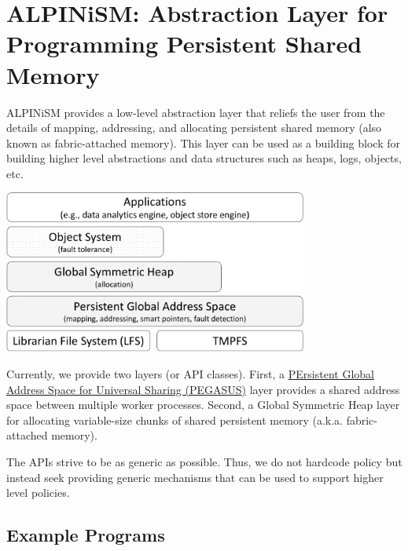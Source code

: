 \hypertarget{md__home_yuan_Benchmarks_whisper_mnemosyne-gcc_usermode_library_pmalloc_include_alps_src_mainpage_mainpage}{}\section{A\+L\+P\+I\+Ni\+S\+M\+: Abstraction Layer for Programming Persistent Shared Memory   }\label{md__home_yuan_Benchmarks_whisper_mnemosyne-gcc_usermode_library_pmalloc_include_alps_src_mainpage_mainpage}
A\+L\+P\+I\+Ni\+SM provides a low-\/level abstraction layer that reliefs the user from the details of mapping, addressing, and allocating persistent shared memory (also known as fabric-\/attached memory). This layer can be used as a building block for building higher level abstractions and data structures such as heaps, logs, objects, etc.

 
\begin{DoxyImage}
\includegraphics[width=10cm]{alps-layers}
\caption{A\+L\+P\+I\+Ni\+SM layers}
\end{DoxyImage}


Currently, we provide two layers (or A\+PI classes). First, a \hyperlink{md__home_yuan_Benchmarks_whisper_mnemosyne-gcc_usermode_library_pmalloc_include_alps_src_pegasus_pegasus_pegasuspage}{P\+Ersistent Global Address Space for Universal Sharing (P\+E\+G\+A\+S\+US)} layer provides a shared address space between multiple worker processes. Second, a Global Symmetric Heap layer for allocating variable-\/size chunks of shared persistent memory (a.\+k.\+a. fabric-\/attached memory).

The A\+P\+Is strive to be as generic as possible. Thus, we do not hardcode policy but instead seek providing generic mechanisms that can be used to support higher level policies.

\subsection*{Example Programs}

